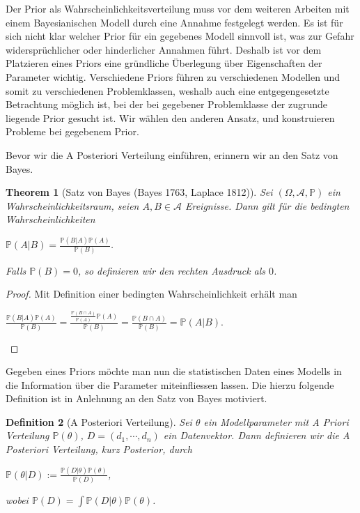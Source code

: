 \documentclass{report}
\theoremstyle{linebreak}
\newtheorem{defi}{Definition}%
\newtheorem{theorem}[defi]{Theorem}
\begin{document}
Der Prior als Wahrscheinlichkeitsverteilung muss vor dem weiteren Arbeiten mit einem Bayesianischen Modell durch eine Annahme festgelegt werden. Es ist für sich nicht klar welcher Prior für ein gegebenes Modell sinnvoll ist, was zur Gefahr widersprüchlicher oder hinderlicher Annahmen führt. Deshalb ist vor dem Platzieren eines Priors eine gründliche Überlegung über Eigenschaften der Parameter wichtig. Verschiedene Priors führen zu verschiedenen Modellen und somit zu verschiedenen Problemklassen, weshalb auch eine entgegengesetzte Betrachtung möglich ist, bei der bei gegebener Problemklasse der zugrunde liegende Prior gesucht ist. Wir wählen den anderen Ansatz, und konstruieren Probleme bei gegebenem Prior.

Bevor wir die A Posteriori Verteilung einführen, erinnern wir an den Satz von Bayes.

\begin{theorem}[Satz von Bayes (Bayes 1763, Laplace 1812)]
	Sei $(\Omega, \mathcal{A}, \mathbb{P})$ ein Wahrscheinlichkeitsraum, seien 
	$A,B \in \mathcal{A}$ Ereignisse. Dann gilt für die bedingten Wahrscheinlichkeiten
	\begin{center}
		$\mathbb{P}(A\vert B) = \frac{\mathbb{P}(B \vert A) \mathbb{P}(A)}{\mathbb{P}				(B)}$.
	\end{center}
	Falls $\mathbb{P}(B) = 0$, so definieren wir den rechten Ausdruck als $0$.
\end{theorem}

\begin{proof}
	Mit Definition einer bedingten Wahrscheinlichkeit erhält man
	\begin{center}
		$\frac{\mathbb{P}(B \vert A) \mathbb{P}(A)}{\mathbb{P}(B)}
		= \frac{\frac{\mathbb{P}(B \cap A)}{\mathbb{P}(A)} \mathbb{P}(A)}{\mathbb{P}(B)}
		= \frac{\mathbb{P}(B \cap A)}{\mathbb{P}(B)}
		= \mathbb{P}(A\vert B)$.
	\end{center}
\end{proof}

Gegeben eines Priors möchte man nun die statistischen Daten eines Modells in die Information über die Parameter miteinfliessen lassen. Die hierzu folgende Definition ist in Anlehnung an den Satz von Bayes motiviert.

\begin{defi}[A Posteriori Verteilung]
	Sei $\theta$ ein Modellparameter mit A Priori Verteilung $\mathbb{P}(\theta)$, $D = 		(d_1, \cdots, d_n)$ ein Datenvektor. Dann definieren wir die \textit{A Posteriori 			Verteilung}, kurz \textit{Posterior}, durch
	\begin{center}
		$\mathbb{P}(\theta \vert D) := \frac{\mathbb{P}(D \vert \theta) 
		\mathbb{P}(\theta)}{\mathbb{P}(D)}$,
	\end{center}
	wobei $\mathbb{P}(D) = \int \mathbb{P}(D \vert \theta) \mathbb{P}(\theta)$.
\end{defi}
\end{document}
